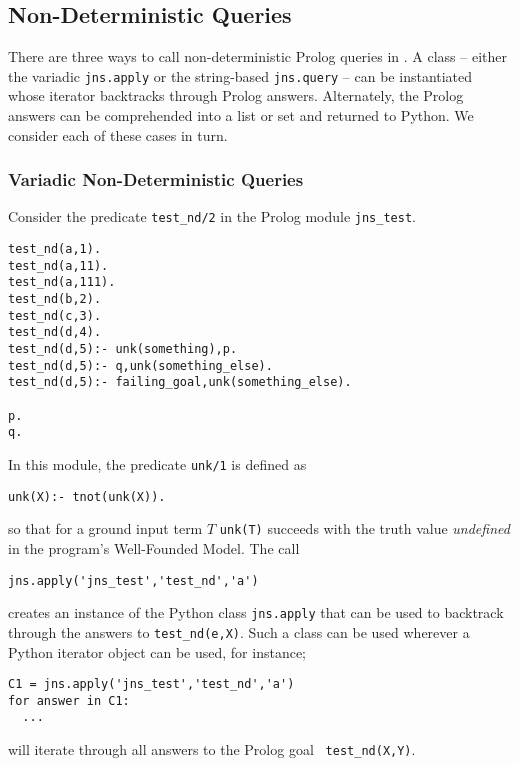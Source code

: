 
\subsection{Non-Deterministic Queries}\label{sec:jnsnteddet}

There are three ways to call non-deterministic Prolog queries in
\januspy .  A class -- either the variadic {\tt jns.apply} or the
string-based {\tt jns.query} -- can be instantiated whose iterator
backtracks through Prolog answers.  Alternately, the Prolog answers
can be comprehended into a list or set and returned to Python.  We
consider each of these cases in turn.

\subsubsection{Variadic Non-Deterministic Queries} \label{sec:var-nd}

Consider the predicate {\tt test\_nd/2} in the Prolog module {\tt jns\_test}.
{\small  
\begin{verbatim}  
test_nd(a,1).
test_nd(a,11).
test_nd(a,111).
test_nd(b,2).
test_nd(c,3).
test_nd(d,4).
test_nd(d,5):- unk(something),p.
test_nd(d,5):- q,unk(something_else).
test_nd(d,5):- failing_goal,unk(something_else).

p.
q.
\end{verbatim} }
\noindent
In this module, the predicate {\tt unk/1} is defined as
\begin{verbatim}
unk(X):- tnot(unk(X)).
\end{verbatim}
\noindent
so that for a ground input term $T$ {\tt unk(T)} succeeds with the
truth value {\em undefined} in the program's Well-Founded Model.
%
The call
\begin{verbatim}
jns.apply('jns_test','test_nd','a')
\end{verbatim}
creates an instance of the Python class {\tt jns.apply} that can be
used to backtrack through the answers to {\tt test\_nd(e,X)}.  Such a
class can be used wherever a Python iterator object can be used, for
instance;
\begin{verbatim}
C1 = jns.apply('jns_test','test_nd','a')
for answer in C1:
  ...
\end{verbatim}
will iterate through all answers to the Prolog goal {\tt
  test\_nd(X,Y)}.

